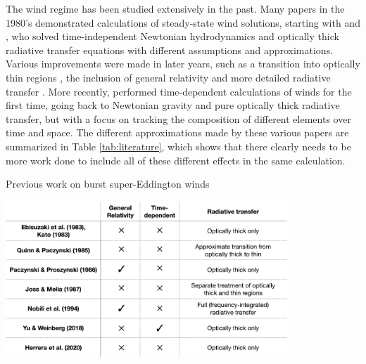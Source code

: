 \documentclass[../main.tex]{subfiles}
\begin{document}
The wind regime has been studied extensively in the past. Many papers in the 1980's demonstrated calculations of steady-state wind solutions, starting with \citet{Ebisuzaki1983} and \citet{Kato1983a}, who solved time-independent Newtonian hydrodynamics and optically thick radiative transfer equations with different assumptions and approximations.  Various improvements were made in later years, such as a transition into optically thin regions \citep{Quinn1985}, the inclusion of general relativity \citep{Paczynski1986b} and more detailed radiative transfer \citep{Joss1987,Nobili1994}.  More recently, \citet{YuHangWeinberg2018} performed time-dependent calculations of winds for the first time, going back to Newtonian gravity and pure optically thick radiative transfer, but with a focus on tracking the composition of different elements over time and space.  The different approximations made by these various papers are summarized in Table \ref{tab:literature}, which shows that there clearly needs to be more work done to include all of these different effects in the same calculation.

\begin{table}[ht!]
    \centering
    \caption{Previous work on burst super-Eddington winds}
    \includegraphics[width=0.8\textwidth]{figures/table.png}
    \label{tab:literature}
\end{table}
\end{document}
